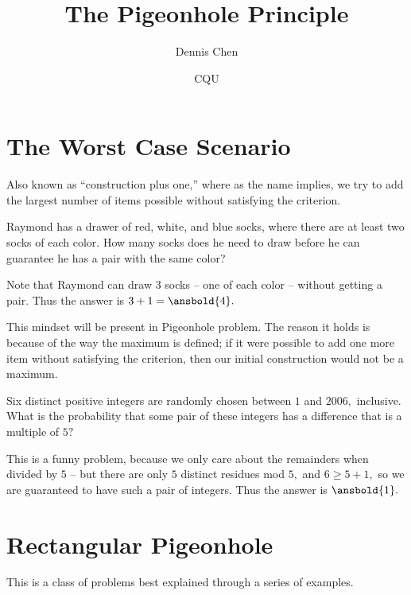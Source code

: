 \documentclass[mast]{lucky}
\title{The Pigeonhole Principle}
\author{Dennis Chen}
\date{CQU}
\begin{document}
\maketitle


\section{The Worst Case Scenario}

Also known as ``construction plus one,'' where as the name implies, we try to add the largest number of items possible without satisfying the criterion. 

\begin{exam}
Raymond has a drawer of red, white, and blue socks, where there are at least two socks of each color. How many socks does he need to draw before he can guarantee he has a pair with the same color?
\end{exam}

\begin{sol}
Note that Raymond can draw $3$ socks -- one of each color -- without getting a pair. Thus the answer is $3+1=\ansbold{4}.$
\end{sol}

This mindset will be present in  Pigeonhole problem. The reason it holds is because of the way the maximum is defined; if it were possible to add one more item without satisfying the criterion, then our initial construction would not be a maximum.

\begin{exam}[AMC 10A 2006/20]
Six distinct positive integers are randomly chosen between $1$ and $2006,$ inclusive. What is the probability that some pair of these integers has a difference that is a multiple of $5?$ 
\end{exam}

\begin{sol}
This is a funny problem, because we only care about the remainders when divided by $5$ -- but there are only $5$ distinct residues mod $5,$ and $6\geq 5+1,$ so we are guaranteed to have such a pair of integers. Thus the answer is $\ansbold{1}.$
\end{sol}

\section{Rectangular Pigeonhole}

This is a class of problems best explained through a series of examples.
\end{document}
